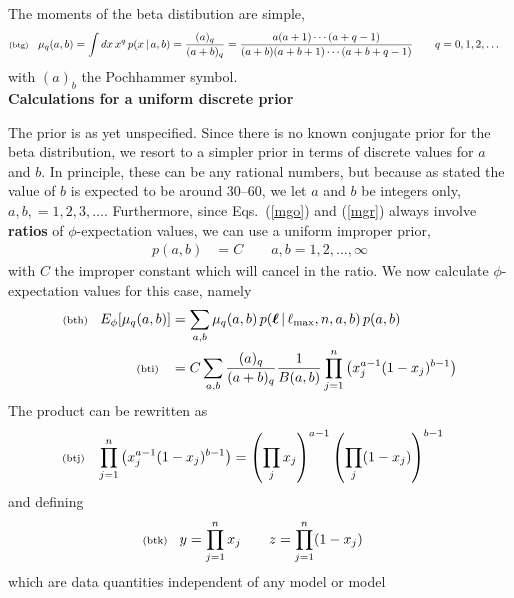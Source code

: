 \documentclass[11pt]{article}
\newcommand{\lleq}[1]{\label{#1} }
\renewcommand{\lleq}[1]{\label{#1} {\scriptstyle {\rm (#1)}} \hspace*{2ex} }
\newcommand{\cond}{\,|\,}
\newcommand{\bml}{{\bm{\ell}}}
\begin{document}
The moments of the beta distibution are simple,
\begin{align}
  \lleq{btg}
  \mu_q(a,b) &= \int dx\,x^q\,p(x\cond a,b)
  = \frac{(a)_q}{(a+b)_q}
  = \frac{a(a+1)\cdots(a+q-1)} {(a+b)(a+b+1)\cdots(a+b+q-1)}
  \qquad q = 0,1,2,\ldots
\end{align}
with $(a)_b$ the Pochhammer symbol.
%
\\

\textbf{Calculations for a uniform discrete prior}

The prior is as yet unspecified. Since there is no known conjugate
prior for the beta distribution, we resort to a simpler prior in terms
of discrete values for $a$ and $b$. In principle, these can be any
rational numbers, but because as stated the value of $b$ is expected
to be around 30--60, we let $a$ and $b$ be integers only, $a,b, =
1,2,3,\ldots$. Furthermore, since Eqs.~(\ref{mgo}) and (\ref{mgr})
always involve \textbf{ratios} of $\phi$-expectation values, we can
use a uniform improper prior,
\begin{align}
  p(a,b) &= C\qquad a,b = 1,2,\ldots,\infty
\end{align}
with $C$ the improper constant which will cancel in the ratio.
We now calculate $\phi$-expectation values for this case, namely
\begin{align}
  \lleq{bth}
  E_\phi[\mu_q(a,b)] &= \sum_{a,b}\mu_q(a,b)\,p(\bml\cond \ell_{\rm max}, n,a,b)
  \,p(a,b)
  \\
  \lleq{bti}
  &= C\sum_{a,b} \frac{(a)_q}{(a+b)_q}
  \frac{1}{B(a,b)} \prod_{j=1}^n \left(x_j^{a-1}(1-x_j)^{b-1}\right)
\end{align}
The product can be rewritten as
\begin{align}
  \lleq{btj}
  \prod_{j=1}^n \left(x_j^{a-1}(1-x_j)^{b-1}\right)
  &= \left(\prod_j x_j\right)^{a-1}\left(\prod_j(1-x_j)\right)^{b-1}
\end{align}
and defining
\begin{align}
  \lleq{btk}
  y &= \prod_{j=1}^n x_j \qquad z = \prod_{j=1}^n(1-x_j)
\end{align}
which are data quantities independent of any model or model
\end{document}
